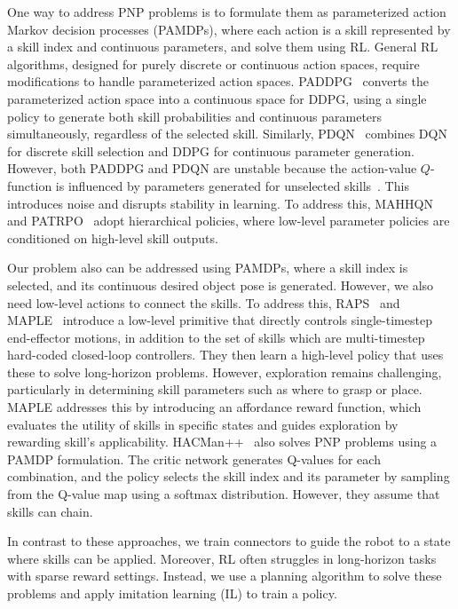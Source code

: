 One way to address PNP problems is to formulate them as parameterized action Markov decision processes (PAMDPs), where each action is a skill represented by a skill index and continuous parameters, and solve them using RL. General RL algorithms, designed for purely discrete or continuous action spaces, require modifications to handle parameterized action spaces. PADDPG~\cite{hausknecht2015deep} converts the parameterized action space into a continuous space for DDPG, using a single policy to generate both skill probabilities and continuous parameters simultaneously, regardless of the selected skill. Similarly, PDQN~\cite{xiong2018parametrized} combines DQN for discrete skill selection and DDPG for continuous parameter generation. However, both PADDPG and PDQN are unstable because the action-value \( Q \)-function is influenced by parameters generated for unselected skills~\cite{li2021hyar}. This introduces noise and disrupts stability in learning. To address this, MAHHQN~\cite{fu2019deep} and PATRPO~\cite{wei2018hierarchical} adopt hierarchical policies, where low-level parameter policies are conditioned on high-level skill outputs.

Our problem also can be addressed using PAMDPs, where a skill index is selected, and its continuous desired object pose is generated. However, we also need low-level actions to connect the skills. To address this, RAPS~\cite{dalal2021accelerating} and MAPLE~\cite{nasiriany2022augmenting} introduce a low-level primitive that directly controls single-timestep end-effector motions, in addition to the set of skills which are multi-timestep hard-coded closed-loop controllers. They then learn a high-level policy that uses these to solve long-horizon problems. However, exploration remains challenging, particularly in determining skill parameters such as where to grasp or place. MAPLE addresses this by introducing an affordance reward function, which evaluates the utility of skills in specific states and guides exploration by rewarding skill's applicability. %
HACMan++~\cite{jiang2024hacmanpp} also solves PNP problems using a PAMDP formulation. The critic network generates Q-values for each combination, and the policy selects the skill index and its parameter by sampling from the Q-value map using a softmax distribution. However, they assume that skills can chain.

In contrast to these approaches, we train connectors to guide the robot to a state where skills can be applied. Moreover, RL often struggles in long-horizon tasks with sparse reward settings. Instead, we use a planning algorithm to solve these problems and apply imitation learning (IL) to train a policy.

